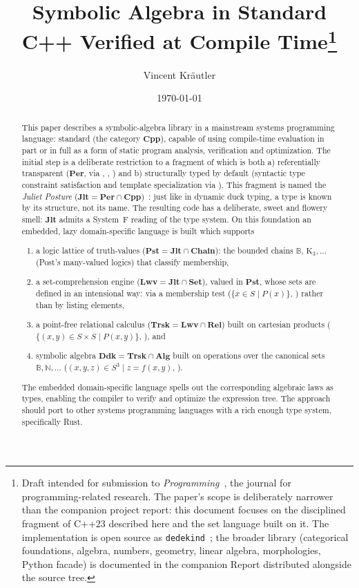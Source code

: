 \documentclass[11pt, a4paper]{article}
\title{Symbolic Algebra in Standard C++ Verified at Compile Time\thanks{%
    Draft intended for submission to \emph{Programming}~\cite{programming_journal},
    the journal for programming-related research.
    The paper's scope is deliberately narrower than the companion project
    report: this document focuses on the disciplined fragment of C++23
    described here and the set language built on it.
    The implementation is open source as \texttt{dedekind}~\cite{Krautler_dedekind_2026};
    the broader library (categorical foundations, algebra, numbers,
    geometry, linear algebra, morphologies, Python facade) is
    documented in the companion Report distributed alongside the source
    tree.}}
\author{Vincent Kr\"autler}
\date{\today}
\begin{document}
\maketitle

\begin{abstract}

This paper describes a symbolic-algebra library in a mainstream systems programming language: standard  (the category $\mathbf{Cpp}$), capable of using compile-time evaluation in part or in full as a form of static program analysis, verification and optimization.
The initial step is a deliberate restriction to a fragment of  which is both a) referentially transparent ($\mathbf{Per}$, via , , ) and b) structurally typed by default (syntactic type constraint satisfaction and template specialization via ).
This fragment is named the \emph{Juliet Posture} ($\mathbf{Jlt} = \mathbf{Per} \cap \mathbf{Cpp}$)~\cite{krautler2026jlt}: just like in dynamic duck typing, a type is known by its structure, not its name.
The resulting code has a deliberate, sweet and flowery smell: $\mathbf{Jlt}$ admits a System~F reading of the  type system.
On this foundation an embedded, lazy domain-specific language is built which supports
\begin{enumerate}
\item a logic lattice of truth-values ($\mathbf{Pst} = \mathbf{Jlt} \cap \mathbf{Chain}$): the bounded chains $\mathbb{B}$, $\mathrm{K}_3, \ldots$ (Post's many-valued logics) that classify membership,
\item a set-comprehension engine ($\mathbf{Lwv} = \mathbf{Jlt} \cap \mathbf{Set}$), valued in $\mathbf{Pst}$, whose sets are defined in an intensional way: via a membership test ($\{ x \in S \mid P(x) \}$, ) rather than by listing elements,
\item a point-free relational calculus ($\mathbf{Trsk} = \mathbf{Lwv} \cap \mathbf{Rel}$) built on cartesian products ($\{ (x, y) \in S \times S \mid P(x, y) \}$, ), and
\item symbolic algebra $\mathbf{Ddk} = \mathbf{Trsk} \cap \mathbf{Alg}$ built on operations over the canonical sets $\mathbb B, \mathbb N, \ldots$ ($(x, y, z) \in S^3 \mid z = f(x, y)$, ).
\end{enumerate}
The embedded domain-specific language spells out the corresponding algebraic laws as types, enabling the compiler to verify and optimize the expression tree.
The approach should port to other systems programming languages with a rich enough type system, specifically Rust.
\end{abstract}
\end{document}
